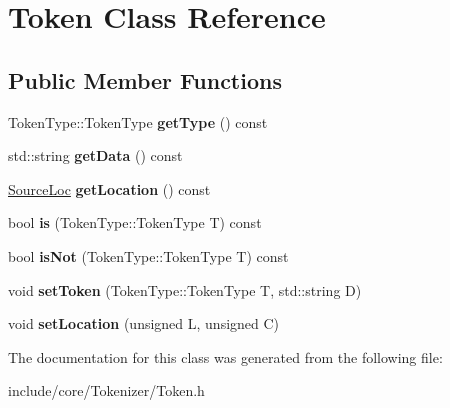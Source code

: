 \hypertarget{class_token}{}\section{Token Class Reference}
\label{class_token}
\subsection*{Public Member Functions}
\begin{DoxyCompactItemize}
\item 
\mbox{\label{class_token_a34dfa2335089397a24c67bef9e1b7ef0}} 
Token\+Type\+::\+Token\+Type {\bfseries get\+Type} () const
\item 
\mbox{\label{class_token_adf398c2071b737b81d1a8a8d42d81a79}} 
std\+::string {\bfseries get\+Data} () const
\item 
\mbox{\label{class_token_ad0efc6a62081434386bd3884ff989880}} 
\mbox{\hyperlink{struct_source_loc}{Source\+Loc}} {\bfseries get\+Location} () const
\item 
\mbox{\label{class_token_ab157cd85f61bc2eba78d19c6ecba18a5}} 
bool {\bfseries is} (Token\+Type\+::\+Token\+Type T) const
\item 
\mbox{\label{class_token_a17d24f13a545757b6398bfe1bc2a6683}} 
bool {\bfseries is\+Not} (Token\+Type\+::\+Token\+Type T) const
\item 
\mbox{\label{class_token_a4d10538210da64d75da96638ee93daca}} 
void {\bfseries set\+Token} (Token\+Type\+::\+Token\+Type T, std\+::string D)
\item 
\mbox{\label{class_token_a46c2f97f02c6b8979a7963b9a9feb05b}} 
void {\bfseries set\+Location} (unsigned L, unsigned C)
\end{DoxyCompactItemize}


The documentation for this class was generated from the following file\+:\begin{DoxyCompactItemize}
\item 
include/core/\+Tokenizer/Token.\+h\end{DoxyCompactItemize}
